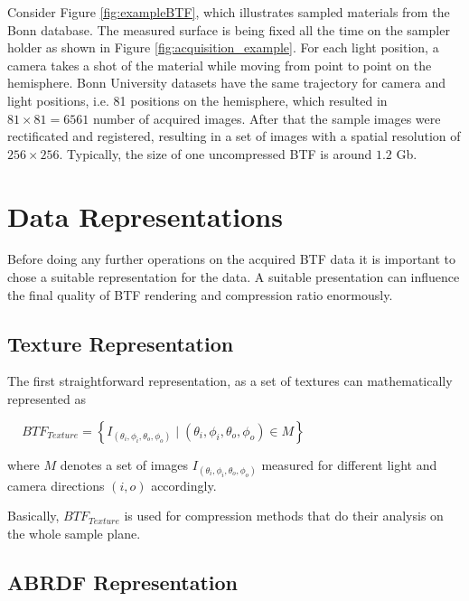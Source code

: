  Consider Figure \ref{fig:exampleBTF}, which illustrates sampled materials from the Bonn database.
The measured surface is being fixed all the time on the sampler holder as shown in Figure \ref{fig:acquisition_example}. 
For each light position, a camera takes a shot of the material while moving from point to point on the hemisphere.
Bonn University datasets have the same trajectory for camera and light positions, i.e. 81 positions on the hemisphere, which resulted in $81\times81=6561$ number of acquired images.
After that the sample images were rectificated and registered, resulting in a set of images with a spatial resolution of $256\times256$.
Typically, the size of one uncompressed BTF is around $1.2$ Gb.



\section{Data Representations}
\label{chapter:representations}




Before doing any further operations on the acquired BTF data it is important to chose a suitable representation for the data.
A suitable presentation can  influence the final quality of BTF rendering and compression ratio enormously.
\subsection{Texture Representation}
\label{chapter:texture_repr}

 The first straightforward representation, as a set of textures can mathematically represented as

{\centering $\,\,\,\,\,\,\,BTF_{Texture}=\left \{I_{(\theta_{i} ,\phi_{i},\theta_{o} ,\phi_{o}) }  \mid  (\theta_{i},\phi_{i},\theta_{o} ,\phi_{o})\in M \right \}$\\}


where $M$ denotes a set of images $I_{(\theta_{i} ,\phi_{i},\theta_{o} ,\phi_{o})}$ measured for different light and camera directions $(i,o)$ accordingly.

Basically, $BTF_{Texture}$ is used for compression methods that do their analysis on the whole sample plane.

\subsection{ABRDF Representation}
\label{chapter:abrdf_repr}

